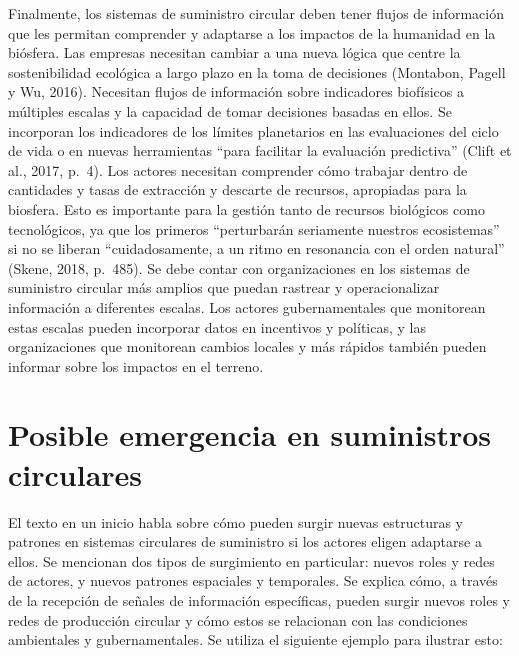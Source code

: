 \documentclass[runningheads]{llncs}
\begin{document}
Finalmente, los sistemas de suministro circular deben tener flujos de
información que les permitan comprender y adaptarse a los impactos de la
humanidad en la biósfera. Las empresas necesitan cambiar a una nueva
lógica que centre la sostenibilidad ecológica a largo plazo en la toma
de decisiones (Montabon, Pagell y Wu, 2016). Necesitan flujos de
información sobre indicadores biofísicos a múltiples escalas y la
capacidad de tomar decisiones basadas en ellos. Se incorporan los
indicadores de los límites planetarios en las evaluaciones del ciclo de
vida o en nuevas herramientas ``para facilitar la evaluación
predictiva'' (Clift et al., 2017, p.~4). Los actores necesitan
comprender cómo trabajar dentro de cantidades y tasas de extracción y
descarte de recursos, apropiadas para la biosfera. Esto es importante
para la gestión tanto de recursos biológicos como tecnológicos, ya que
los primeros ``perturbarán seriamente nuestros ecosistemas'' si no se
liberan ``cuidadosamente, a un ritmo en resonancia con el orden
natural'' (Skene, 2018, p.~485). Se debe contar con organizaciones en
los sistemas de suministro circular más amplios que puedan rastrear y
operacionalizar información a diferentes escalas. Los actores
gubernamentales que monitorean estas escalas pueden incorporar datos en
incentivos y políticas, y las organizaciones que monitorean cambios
locales y más rápidos también pueden informar sobre los impactos en el
terreno.

\hypertarget{posible-emergencia-en-suministros-circulares}{%
\section{Posible emergencia en suministros
circulares}\label{posible-emergencia-en-suministros-circulares}}

El texto en un inicio habla sobre cómo pueden surgir nuevas estructuras
y patrones en sistemas circulares de suministro si los actores eligen
adaptarse a ellos. Se mencionan dos tipos de surgimiento en particular:
nuevos roles y redes de actores, y nuevos patrones espaciales y
temporales. Se explica cómo, a través de la recepción de señales de
información específicas, pueden surgir nuevos roles y redes de
producción circular y cómo estos se relacionan con las condiciones
ambientales y gubernamentales. Se utiliza el siguiente ejemplo para
ilustrar esto:\\
\end{document}
